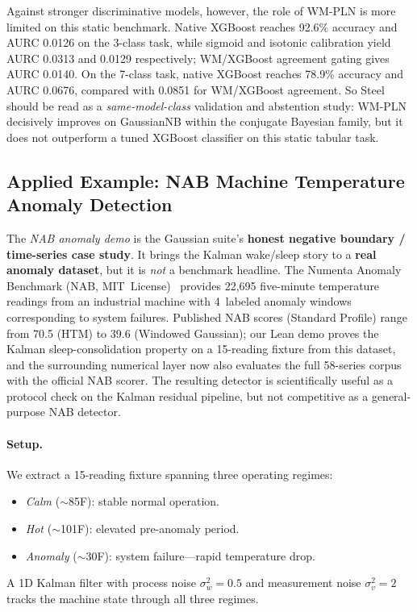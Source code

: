 \documentclass[11pt,openany]{report}
\begin{document}
Against stronger discriminative models, however, the role of WM-PLN is
more limited on this static benchmark.  Native XGBoost reaches 92.6\%
accuracy and AURC 0.0126 on the 3-class task, while sigmoid and isotonic
calibration yield AURC 0.0313 and 0.0129 respectively; WM/XGBoost
agreement gating gives AURC 0.0140.  On the 7-class task, native
XGBoost reaches 78.9\% accuracy and AURC 0.0676, compared with 0.0851
for WM/XGBoost agreement.  So Steel should be read as a
\emph{same-model-class} validation and abstention study: WM-PLN
decisively improves on GaussianNB within the conjugate Bayesian family,
but it does not outperform a tuned XGBoost classifier on this static
tabular task.

\subsection{Applied Example: NAB Machine Temperature Anomaly Detection}

The \emph{NAB anomaly demo} is the Gaussian suite's
\textbf{honest negative boundary / time-series case study}.  It brings
the Kalman wake/sleep story to a \textbf{real anomaly dataset}, but it
is \emph{not} a benchmark headline.
The Numenta Anomaly Benchmark
(NAB, MIT~License)~\cite{Lavin2015NAB} provides 22,695 five-minute
temperature readings from an industrial machine with 4~labeled
anomaly windows corresponding to system failures.  Published NAB
scores (Standard Profile) range from 70.5 (HTM) to 39.6 (Windowed
Gaussian); our Lean demo proves the Kalman sleep-consolidation property
on a 15-reading fixture from this dataset, and the surrounding
numerical layer now also evaluates the full 58-series corpus with the
official NAB scorer.  The resulting detector is scientifically useful as
a protocol check on the Kalman residual pipeline, but not competitive as
a general-purpose NAB detector.

\paragraph{Setup.}
We extract a 15-reading fixture spanning three operating regimes:
\begin{itemize}
\item \emph{Calm} ($\sim$85\textdegree{}F): stable normal operation.
\item \emph{Hot} ($\sim$101\textdegree{}F): elevated pre-anomaly period.
\item \emph{Anomaly} ($\sim$30\textdegree{}F): system failure---rapid
  temperature drop.
\end{itemize}
A 1D Kalman filter with process noise $\sigma_w^2 = 0.5$ and measurement
noise $\sigma_v^2 = 2$ tracks the machine state through all three regimes.
\end{document}
